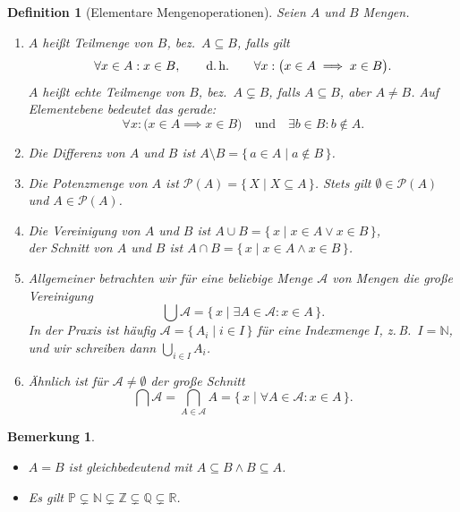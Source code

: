 \documentclass[a4paper]{article}
\theoremstyle{kurzskript}
\newtheorem{definition}[satz]{Definition}
\newtheorem*{bem}{Bemerkung}
\newcommand{\N}{\mathbb{N}}
\newcommand{\Z}{\mathbb{Z}}
\newcommand{\Q}{\mathbb{Q}}
\newcommand{\R}{\mathbb{R}}
\newcommand{\Pm}{\mathbb{P}}
\newcommand{\Pot}{\mathcal{P}}
\begin{document}
\begin{definition}[Elementare Mengenoperationen]
Seien $A$ und $B$ Mengen.
\begin{enumerate}[label=(\alph*)]
  \item $A$ heißt \emph{Teilmenge} von $B$, bez.\ $A \subseteq B$, falls gilt
  \[
    \forall x \in A: x \in B, \qquad\text{d.\,h.}\qquad \forall x: \bigl(x \in A \implies x \in B\bigr).
  \]
  $A$ heißt \emph{echte Teilmenge} von $B$, bez.\ $A \subsetneq B$, falls $A \subseteq B$, aber $A \neq B$. Auf Elementebene bedeutet das gerade:
  \[
    \forall x: \bigl(x \in A \implies x \in B\bigr) \quad\text{und}\quad \exists b \in B: b \notin A.
  \]
  \item Die \emph{Differenz} von $A$ und $B$ ist $A \setminus B = \{\, a \in A \mid a \notin B \,\}$.
  \item Die \emph{Potenzmenge} von $A$ ist $\Pot(A) = \{\, X \mid X \subseteq A \,\}$. Stets gilt $\emptyset \in \Pot(A)$ und $A \in \Pot(A)$.
  \item Die \emph{Vereinigung} von $A$ und $B$ ist $A \cup B = \{\, x \mid x \in A \lor x \in B \,\}$, \\
        der \emph{Schnitt} von $A$ und $B$ ist $A \cap B = \{\, x \mid x \in A \land x \in B \,\}$.
  \item Allgemeiner betrachten wir für eine beliebige Menge $\mathcal{A}$ von Mengen die \emph{große Vereinigung}
  \[
    \bigcup \mathcal{A} = \{\, x \mid \exists A \in \mathcal{A}: x \in A \,\}.
  \]
  In der Praxis ist häufig $\mathcal{A} = \{\, A_i \mid i \in I \,\}$ für eine \emph{Indexmenge} $I$, z.\,B.\ $I = \N$, und wir schreiben dann $\bigcup_{i \in I} A_i$.
  \item Ähnlich ist für $\mathcal{A} \neq \emptyset$ der \emph{große Schnitt}
  \[
    \bigcap \mathcal{A} = \bigcap_{A \in \mathcal{A}} A = \{\, x \mid \forall A \in \mathcal{A}: x \in A \,\}.
  \]
\end{enumerate}
\end{definition}

\begin{bem}
\leavevmode
\begin{itemize}
  \item $A = B$ ist gleichbedeutend mit $A \subseteq B \land B \subseteq A$.
  \item Es gilt $\Pm \subsetneq \N \subsetneq \Z \subsetneq \Q \subsetneq \R$.
\end{itemize}
\end{bem}
\end{document}
